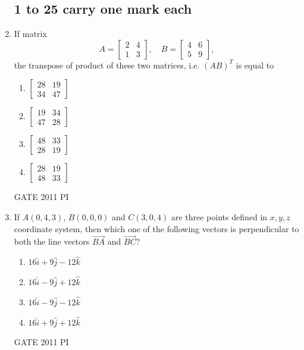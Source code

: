 \documentclass[journal,12pt,onecolumn]{IEEEtran}
\theoremstyle{remark}
\begin{document}
\begin{enumerate}
   \subsection*{1 to 25 carry one mark each}

\item If matrix 
\[
A = \begin{bmatrix} 2 & 4 \\ 1 & 3 \end{bmatrix}, \quad 
B = \begin{bmatrix} 4 & 6 \\ 5 & 9 \end{bmatrix},
\]
the transpose of product of these two matrices, i.e. $(AB)^T$ is equal to

\begin{multicols}{2}
\begin{enumerate}
    \item $\begin{bmatrix} 28 & 19 \\ 34 & 47 \end{bmatrix}$
    \item $\begin{bmatrix} 19 & 34 \\ 47 & 28 \end{bmatrix}$
    \item $\begin{bmatrix} 48 & 33 \\ 28 & 19 \end{bmatrix}$
    \item $\begin{bmatrix} 28 & 19 \\ 48 & 33 \end{bmatrix}$
\end{enumerate}
\end{multicols}
\hfill{GATE 2011 PI}

\item If $A(0,4,3)$, $B(0,0,0)$ and $C(3,0,4)$ are three points defined in $x,y,z$ coordinate system, then which one of the following vectors is perpendicular to both the line vectors $\overrightarrow{BA}$ and $\overrightarrow{BC}$?

\begin{multicols}{2}
\begin{enumerate}
    \item $16\hat{i} + 9\hat{j} - 12\hat{k}$
    \item $16\hat{i} - 9\hat{j} + 12\hat{k}$
    \item $16\hat{i} - 9\hat{j} - 12\hat{k}$
    \item $16\hat{i} + 9\hat{j} + 12\hat{k}$
\end{enumerate}
\end{multicols}
\hfill{GATE 2011 PI}


\end{enumerate}
\end{document}

